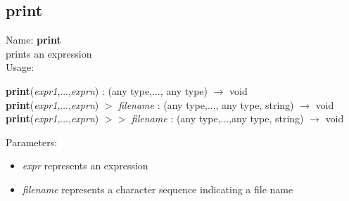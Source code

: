 \subsection{print}
\label{labprint}
\noindent Name: \textbf{print}\\
prints an expression\\
\noindent Usage: 
\begin{center}
\textbf{print}(\emph{expr1},...,\emph{exprn}) : (\textsf{any type},..., \textsf{any type}) $\rightarrow$ \textsf{void}\\
\textbf{print}(\emph{expr1},...,\emph{exprn}) $>$ \emph{filename} : (\textsf{any type},..., \textsf{any type}, \textsf{string}) $\rightarrow$ \textsf{void}\\
\textbf{print}(\emph{expr1},...,\emph{exprn}) $>>$ \emph{filename} : (\textsf{any type},...,\textsf{any type}, \textsf{string}) $\rightarrow$ \textsf{void}\\
\end{center}
Parameters: 
\begin{itemize}
\item \emph{expr} represents an expression
\item \emph{filename} represents a character sequence indicating a file name
\end{itemize}
